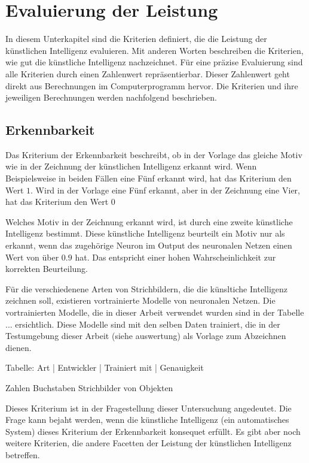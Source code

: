 \section{Evaluierung der Leistung}
\label{chap:m_eval}
In diesem Unterkapitel sind die Kriterien definiert, die die Leistung der
künstlichen Intelligenz evaluieren. Mit anderen Worten beschreiben die
Kriterien, wie gut die künstliche Intelligenz nachzeichnet. Für eine präzise
Evaluierung sind alle Kriterien durch einen Zahlenwert repräsentierbar. Dieser
Zahlenwert geht direkt aus Berechnungen im Computerprogramm hervor. Die
Kriterien und ihre jeweiligen Berechnungen werden nachfolgend beschrieben.

\subsection{Erkennbarkeit}
\label{sub:m_eval_rec}
Das Kriterium der Erkennbarkeit beschreibt, ob in der Vorlage das gleiche Motiv
wie in der Zeichnung der künstlichen Intelligenz erkannt wird. Wenn
Beispielsweise in beiden Fällen eine Fünf erkannt wird, hat das Kriterium den
Wert $1$. Wird in der Vorlage eine Fünf erkannt, aber in der Zeichnung eine
Vier, hat das Kriterium den Wert $0$

Welches Motiv in der Zeichnung erkannt wird, ist durch eine zweite künstliche
Intelligenz bestimmt. Diese künstliche Intelligenz beurteilt ein Motiv nur als
erkannt, wenn das zugehörige Neuron im Output des neuronalen Netzen einen Wert
von über $0.9$ hat. Das entspricht einer hohen Wahrscheinlichkeit zur korrekten
Beurteilung.

Für die verschiedenene Arten von Strichbildern, die die künsltiche Intelligenz
zeichnen soll, existieren vortrainierte Modelle von neuronalen Netzen. Die
vortrainierten Modelle, die in dieser Arbeit verwendet wurden sind in der
Tabelle ... ersichtlich. Diese Modelle sind mit den selben Daten trainiert, die
in der Testumgebung dieser Arbeit (siehe auswertung) als Vorlage zum Abzeichnen
dienen. %


Tabelle:
Art       |       Entwickler      |     Trainiert mit     |      Genauigkeit 

Zahlen  
Buchstaben
Strichbilder von Objekten

Dieses Kriterium ist in der Fragestellung dieser Untersuchung angedeutet. Die
Frage kann bejaht werden, wenn die künstliche Intelligenz (ein automatisches
System) dieses Kriterium der Erkennbarkeit konsequet erfüllt. Es gibt aber noch
weitere Kriterien, die andere Facetten der Leistung der künstlichen Intelligenz
betreffen.

